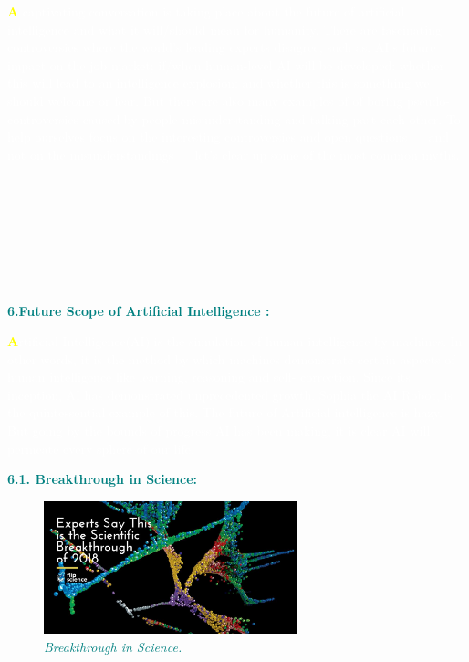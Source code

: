 \documentclass[12pt]{article}
\begin{document}
\textcolor{white}{\textbf{\textcolor{yellow}{\huge A}} captivating conversation is taking place about the future of artificial intelligence and what it will/should mean for humanity. There are fascinating controversies where the world’s leading experts disagree,
 such as: AI’s future impact on the job market; if/when human-level AI will be developed; whether this will lead to an intelligence explosion; and whether this is something we should welcome or fear. But there are also many examples of of boring pseudo-controversies caused by people misunderstanding and talking past each other. To help ourselves focus on the interesting controversies and open questions — and not on the misunderstandings — let’s  clear up some of the most common myths.}\\\\\\\\\\\\\\\\
 
 \begin{large}
 \textbf{\textcolor{teal}{6.Future Scope of Artificial Intelligence :}}\\
 \end{large}
 
 \textcolor{white}{\textbf{\textcolor{yellow}{\huge A}}rtificial Intelligence(AI) is the simulation of human intelligence by machines. In other words, it is the method by which machines demonstrate certain aspects of human intelligence like learning, reasoning and self- correction. Since its inception, AI has demonstrated unprecedented growth. Sophia the AI Robot, is the quintessential example of this. The future of Artificial intelligence is hazy. But going by the bounds of progress AI has been making, it is clear AI will permeate every sphere of our life.}\\
 
 \begin{large}
 \textbf{\textcolor{teal}{6.1. Breakthrough in Science:}}\\
 \end{large}
 
\begin{figure}
\centering
\includegraphics[width=2.9in]{FS.Covers.Dec2018-Jan2019-2-2}

\caption{\textit{\textcolor{teal}{Breakthrough in Science.}}}
\end{figure} 
 
\end{document}
